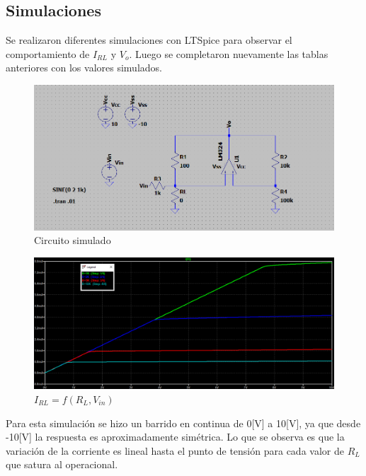 \subsection{Simulaciones}
Se realizaron diferentes simulaciones con LTSpice para observar el comportamiento de $I_{RL}$ y $V_o$. 
Luego se completaron nuevamente las tablas anteriores con los valores simulados.

\begin{figure}[H]
	\centering
	\includegraphics[width=1\textwidth]{figuras/circuito2.png}
	\caption{Circuito simulado}
\end{figure}
\begin{figure}[H]
	\centering
	\includegraphics[width=1\textwidth]{figuras/dcsweep_rl.png}
	\caption{$I_{RL} = f(R_L , V_{in})$}
\end{figure}
Para esta simulación se hizo un barrido en continua de 0[V] a 10[V], ya que desde -10[V] la respuesta es aproximadamente simétrica. Lo que se observa es que la variación de la corriente es lineal hasta el punto de tensión para cada valor de $R_L$  que satura al operacional. 
